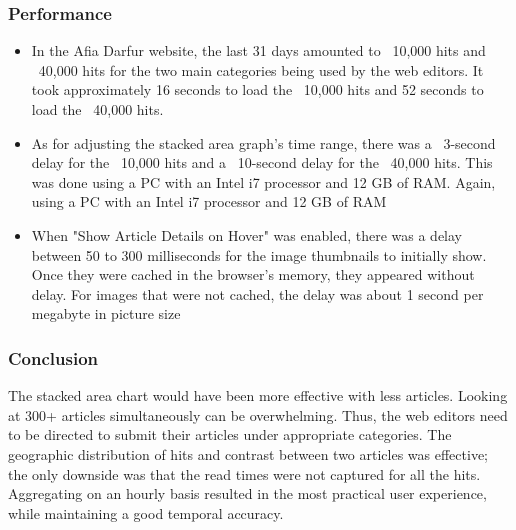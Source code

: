 \documentclass[12pt]{article}
\begin{document}
\subsubsection{Performance}
\begin{itemize}
\item In the Afia Darfur website, the last 31 days amounted to ~10,000 hits and ~40,000 hits for the two main categories being used by the web editors. It took approximately 16 seconds to load the ~10,000 hits and 52 seconds to load the ~40,000 hits. 
\item As for adjusting the stacked area graph's time range, there was a ~3-second delay for the ~10,000 hits and a ~10-second delay for the ~40,000 hits. This was done using a PC with an Intel i7 processor and 12 GB of RAM. Again, using a PC with an Intel i7 processor and 12 GB of RAM
\item When "Show Article Details on Hover" was enabled, there was a delay between 50 to 300 milliseconds for the image thumbnails to initially show. Once they were cached in the browser's memory, they appeared without delay. For images that were not cached, the delay was about 1 second per megabyte in picture size
\end{itemize}

\subsubsection{Conclusion}
The stacked area chart would have been more effective with less articles. Looking at 300+ articles simultaneously can be overwhelming. Thus, the web editors need to be directed to submit their articles under appropriate categories. The geographic distribution of hits and contrast between two articles was effective; the only downside was that the read times were not captured for all the hits. Aggregating on an hourly basis resulted in the most practical user experience, while maintaining a good temporal accuracy.  

\newpage
\end{document}
